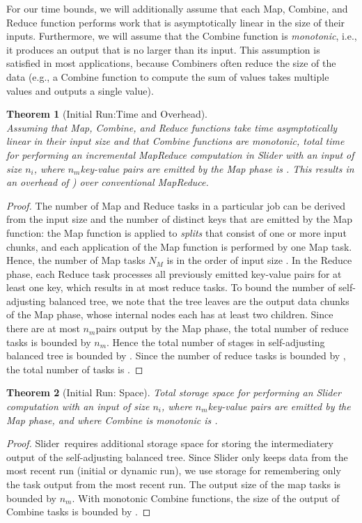 \documentclass{article}
\newcommand{\projecttitle}{Slider\xspace}
\newtheorem{theorem}{Theorem}
\newcommand{\ninput}{\ensuremath{n_i}\xspace}
\newcommand{\nmap}{\ensuremath{N_M}\xspace}
\newcommand{\nkeyvaluemap}{\ensuremath{n_{m}}}
\begin{document}
For our time bounds, we will additionally assume that each Map,
Combine, and Reduce function performs work that is asymptotically
linear in the size of their inputs.  Furthermore, we will assume that
the Combine function is {\em monotonic}, i.e., it produces an output
that is no larger than its input. This assumption is satisfied in
most applications, because Combiners often reduce the size of
the data (e.g., a Combine function to compute the sum of values takes
multiple values and outputs a single value).

\begin{theorem}[Initial Run:Time and Overhead]
\label{thm:time-initial}
\label{thm:time-overhead}
~\\
Assuming that Map, Combine, and Reduce functions take time
asymptotically linear in their input size and that Combine functions
are monotonic, total time for performing an incremental MapReduce
computation in \projecttitle with an input of size \ninput, where
\nkeyvaluemap key-value pairs are emitted by the Map phase is
. This
results in an overhead of ) over conventional MapReduce.
\end{theorem}
\begin{proof}
The number of Map and Reduce tasks in a particular job can be derived
from the input size and the number of distinct keys that are emitted
by the Map function: the Map function is applied to \emph{splits} that
consist of one or more input chunks, and each application of the Map
function is performed by one Map task. Hence, the number of Map tasks
\nmap is in the order of input size .  In the Reduce
phase, each Reduce task processes all previously emitted key-value
pairs for at least one key, which results in at most  reduce tasks.  To bound the number of self-adjusting balanced tree,
we note that the tree leaves are the
output data chunks of the Map phase, whose internal nodes each has at
least two children. Since there are at most \nkeyvaluemap pairs output
by the Map phase, the total number of reduce tasks is bounded by
\nkeyvaluemap.  Hence the total number of stages in self-adjusting balanced
tree is bounded by .  Since the number of reduce
tasks is bounded by  , the total number of tasks
is .  
\end{proof}


\begin{theorem}[Initial Run: Space]
\label{thm:space-initial}
Total storage space for performing an \projecttitle computation with
an input of size \ninput, where \nkeyvaluemap key-value pairs are
emitted by the Map phase, and where Combine is monotonic is .
\end{theorem}
\begin{proof}
\projecttitle~requires additional storage space for storing the intermediatery
output of the self-adjusting balanced tree.  Since \projecttitle only keeps data
from the most
recent run (initial or dynamic run), we use storage for
remembering only the task output from the most recent run.  The output size
of the map tasks is bounded by \nkeyvaluemap.  With monotonic Combine
functions, the size of the output of Combine tasks is bounded by
.
\end{proof}
\end{document}
